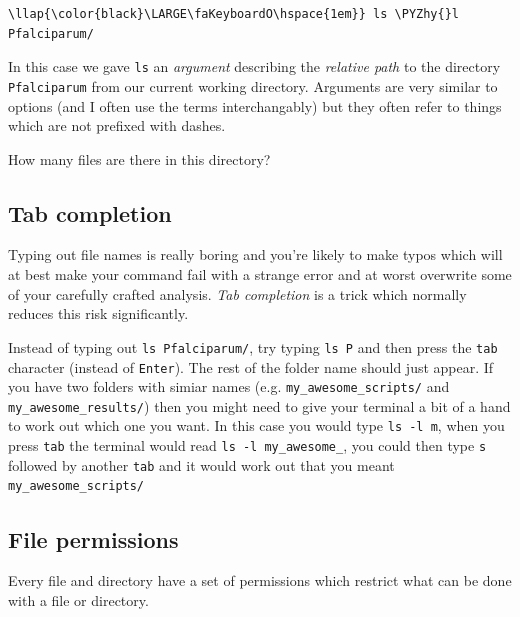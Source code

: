 \documentclass[11pt]{article}
\def\PYZhy{\char`\-}
\begin{document}
\begin{terminalinput}
\begin{Verbatim}[commandchars=\\\{\}]
\llap{\color{black}\LARGE\faKeyboardO\hspace{1em}} ls \PYZhy{}l Pfalciparum/
\end{Verbatim}
\end{terminalinput}

    In this case we gave \texttt{ls} an \textit{argument} describing the
\textit{relative path} to the directory \texttt{Pfalciparum} from our
current working directory. Arguments are very similar to options (and I
often use the terms interchangably) but they often refer to things which
are not prefixed with dashes.

How many files are there in this directory?

    \hypertarget{tab-completion}{%
\subsection{Tab completion}\label{tab-completion}}

Typing out file names is really boring and you're likely to make typos
which will at best make your command fail with a strange error and at
worst overwrite some of your carefully crafted analysis. \textit{Tab
completion} is a trick which normally reduces this risk significantly.

Instead of typing out \texttt{ls\ Pfalciparum/}, try typing
\texttt{ls\ P} and then press the \texttt{tab} character (instead of
\texttt{Enter}). The rest of the folder name should just appear. If you
have two folders with simiar names (e.g. \texttt{my\_awesome\_scripts/}
and \texttt{my\_awesome\_results/}) then you might need to give your
terminal a bit of a hand to work out which one you want. In this case
you would type \texttt{ls\ -l\ m}, when you press \texttt{tab} the
terminal would read \texttt{ls\ -l\ my\_awesome\_}, you could then type
\texttt{s} followed by another \texttt{tab} and it would work out that
you meant \texttt{my\_awesome\_scripts/}

    \hypertarget{file-permissions}{%
\subsection{File permissions}\label{file-permissions}}

Every file and directory have a set of permissions which restrict what
can be done with a file or directory.
\end{document}
